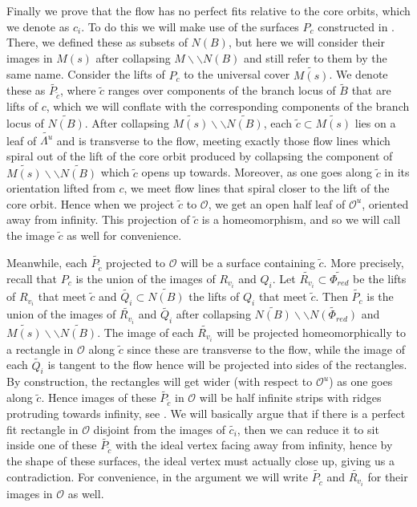 \documentclass[12pt]{amsart}
\theoremstyle{definition}
\numberwithin{equation}{section}
\begin{document}
Finally we prove that the flow has no perfect fits relative to the core orbits, which we denote as $c_i$. To do this we will make use of the surfaces $P_c$ constructed in . There, we defined these as subsets of $N(B)$, but here we will consider their images in $M(s)$ after collapsing $M \backslash \backslash N(B)$ and still refer to them by the same name. Consider the lifts of $P_c$ to the universal cover $\widetilde{M(s)}$. We denote these as $\widetilde{P_{\widetilde{c}}}$, where $\widetilde{c}$ ranges over components of the branch locus of $\widetilde{B}$ that are lifts of $c$, which we will conflate with the corresponding components of the branch locus of $\widetilde{N(B)}$. After collapsing $\widetilde{M(s)} \backslash \backslash \widetilde{N(B)}$, each $\widetilde{c} \subset \widetilde{M(s)}$ lies on a leaf of $\widetilde{\Lambda^u}$ and is transverse to the flow, meeting exactly those flow lines which spiral out of the lift of the core orbit produced by collapsing the component of $\widetilde{M(s)} \backslash \backslash \widetilde{N(B)}$ which $\widetilde{c}$ opens up towards. Moreover, as one goes along $\widetilde{c}$ in its orientation lifted from $c$, we meet flow lines that spiral closer to the lift of the core orbit. Hence when we project $\widetilde{c}$ to $\mathcal{O}$, we get an open half leaf of $\mathcal{O}^u$, oriented away from infinity. This projection of $\widetilde{c}$ is a homeomorphism, and so we will call the image $\widetilde{c}$ as well for convenience.

Meanwhile, each $\widetilde{P_{\widetilde{c}}}$ projected to $\mathcal{O}$ will be a surface containing $\widetilde{c}$. More precisely, recall that $P_c$ is the union of the images of $R_{v_i}$ and $Q_i$. Let $\widetilde{R_{v_i}} \subset \widetilde{\Phi_{red}}$ be the lifts of $R_{v_i}$ that meet $\widetilde{c}$ and $\widetilde{Q_i} \subset \widetilde{N(B)}$ the lifts of $Q_i$ that meet $\widetilde{c}$. Then $\widetilde{P_c}$ is the union of the images of $\widetilde{R_{v_i}}$ and $\widetilde{Q_i}$ after collapsing $\widetilde{N(B)} \backslash \backslash \widetilde{N(\Phi_{red})}$ and $\widetilde{M(s)} \backslash \backslash \widetilde{N(B)}$. The image of each $\widetilde{R_{v_i}}$ will be projected homeomorphically to a rectangle in $\mathcal{O}$ along $\widetilde{c}$ since these are transverse to the flow, while the image of each $\widetilde{Q_i}$ is tangent to the flow hence will be projected into sides of the rectangles. By construction, the rectangles will get wider (with respect to $\mathcal{O}^u$) as one goes along $\widetilde{c}$. Hence images of these $\widetilde{P_{\widetilde{c}}}$ in $\mathcal{O}$ will be half infinite strips with ridges protruding towards infinity, see . We will basically argue that if there is a perfect fit rectangle in $\mathcal{O}$ disjoint from the images of $\widetilde{c_i}$, then we can reduce it to sit inside one of these $\widetilde{P_{\widetilde{c}}}$ with the ideal vertex facing away from infinity, hence by the shape of these surfaces, the ideal vertex must actually close up, giving us a contradiction. For convenience, in the argument we will write $\widetilde{P_{\widetilde{c}}}$ and $\widetilde{R_{v_i}}$ for their images in $\mathcal{O}$ as well.
\end{document}
